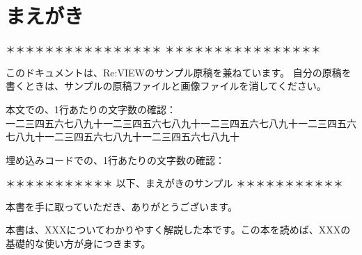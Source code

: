 \chapter{まえがき}
\label{chap:chap00-preface}

\begin{center}
＊＊＊＊＊＊＊＊＊＊＊＊＊＊＊＊  ＊＊＊＊＊＊＊＊＊＊＊＊＊＊＊＊
\end{center}

このドキュメントは、Re:VIEWのサンプル原稿を兼ねています。
自分の原稿を書くときは、サンプルの原稿ファイルと画像ファイルを消してください。

\begin{starterterminal}\end{starterterminal}

本文での、1行あたりの文字数の確認：\\
一二三四五六七八九十一二三四五六七八九十一二三四五六七八九十一二三四五六七八九十一二三四五六七八九十一二三四五六七八九十

埋め込みコードでの、1行あたりの文字数の確認：

\begin{starterprogram}\end{starterprogram}

\begin{center}
＊＊＊＊＊＊＊＊＊＊＊ 以下、まえがきのサンプル ＊＊＊＊＊＊＊＊＊＊＊\\
\end{center}

本書を手に取っていただき、ありがとうございます。

本書は、XXXについてわかりやすく解説した本です。この本を読めば、XXXの基礎的な使い方が身につきます。

